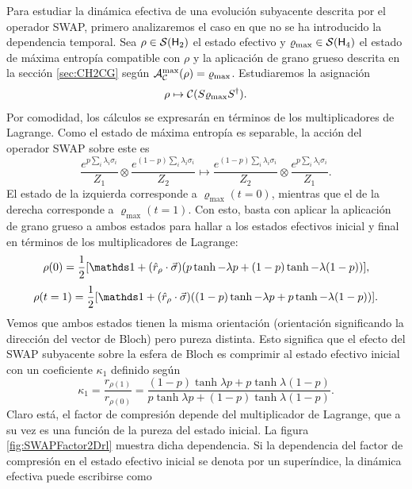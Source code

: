 Para estudiar la dinámica efectiva de una evolución subyacente descrita por el operador SWAP, primero analizaremos el caso en que no se ha introducido la dependencia temporal. Sea $\rho\in\mathcal{S}({\sf H}_{2})$ el estado efectivo y $\varrho_{\max}\in\mathcal{S}({\sf H}_{4})$ el estado de máxima entropía compatible con $\rho$ y la aplicación de grano grueso descrita en la sección \ref{sec:CH2CG} según $\mathcal{A}_{\mathcal{C}}^{\max}(\rho)=\varrho_{\max}$. Estudiaremos la asignación
\begin{equation}
  \rho\mapsto \mathcal{C}(S \varrho_{\max} S^{\dag}).
\end{equation}
Por comodidad, los cálculos se expresarán en términos de los multiplicadores de Lagrange. Como el estado de máxima entropía es separable, la acción del operador SWAP sobre este es
\begin{equation*}
  \frac{e^{p\sum_{i}\lambda_{i}\sigma_{i}}}{Z_{1}} \otimes \frac{e^{(1-p)\sum_{i}\lambda_{i}\sigma_{i}}}{Z_{2}}\mapsto\frac{e^{(1-p)\sum_{i}\lambda_{i}\sigma_{i}}}{Z_{2}}\otimes\frac{e^{p\sum_{i}\lambda_{i}\sigma_{i}}}{Z_{1}}.
\end{equation*}
El estado de la izquierda corresponde a $\varrho_{\max}(t=0)$, mientras que el de la derecha corresponde a $\varrho_{\max}(t=1)$. Con esto, basta con aplicar la aplicación de grano grueso a ambos estados para hallar a los estados efectivos inicial y final en términos de los multiplicadores de Lagrange:
\begin{equation}
\rho(0)=\frac{1}{2}[\Id+(\hat{r}_{\rho}\cdot\vec{\sigma})(p\tanh{-\lambda p}+(1-p)\tanh{-\lambda (1-p)})],
\end{equation}
\begin{equation}
\rho(t=1)=\frac{1}{2}[\Id+(\hat{r}_{\rho}\cdot\vec{\sigma})((1-p)\tanh{-\lambda p}+p\tanh{-\lambda (1-p)})].
\end{equation}
Vemos que ambos estados tienen la misma orientación (orientación significando la dirección del vector de Bloch) pero pureza distinta. Esto significa que el efecto del \textsc{SWAP} subyacente sobre la esfera de Bloch es comprimir al estado efectivo inicial con un coeficiente $\kappa_{1}$ definido según
\begin{equation}\label{eq:SWAPFactor}
  \kappa_{1}=\frac{r_{\rho(1)}}{r_{\rho(0)}}=\frac{(1-p)\tanh{\lambda p}+p\tanh{\lambda (1-p)}}{
    p\tanh{\lambda p}+(1-p)\tanh{\lambda (1-p)}}.
\end{equation}
Claro está, el factor de compresión depende del multiplicador de Lagrange, que a su vez es una función de la pureza del estado inicial. La figura \ref{fig:SWAPFactor2Drl} muestra dicha dependencia. Si la dependencia del factor de compresión en el estado efectivo inicial se denota por un superíndice, la dinámica efectiva puede escribirse como
